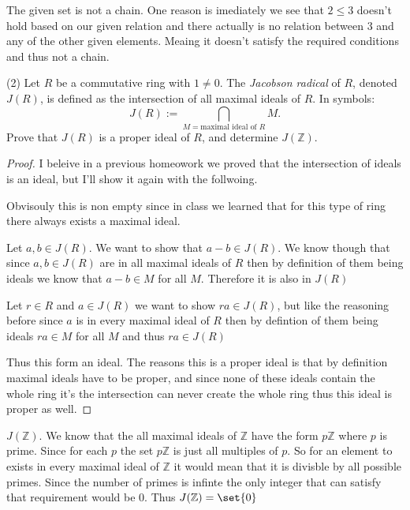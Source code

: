 \documentclass[12pt]{article}
\DeclarePairedDelimiter\set\{\}
\newcommand      {\Z}         {{\mathbb Z}}
\begin{document}
The given set is not a chain. One reason is imediately we see that $2\leq 3$ doesn't hold based on our given relation and there actually is no relation between 3 and any of the other given elements. Meaing it doesn't satisfy the required conditions and thus not a chain. 

\newpage
(2) Let $R$ be a commutative ring with $1\neq 0$. The \textit{Jacobson radical} of $R$, denoted $J(R)$, is defined as the intersection of all maximal ideals of $R$. In symbols:
\begin{equation*}
	J(R):=\bigcap_{M=\text{maximal ideal of }R} M.
\end{equation*}
Prove that $J(R)$ is a proper ideal of $R$, and determine $J(\Z)$.
\begin{proof}
	I beleive in a previous homeowork we proved that the intersection of ideals is an ideal, but I'll show it again with the follwoing. 

	Obvisouly this is non empty since in class we learned that for this type of ring there always exists a maximal ideal. 

	Let $a,b \in J(R)$. We want to show that $a-b \in J(R)$. We know though that since $a,b\in J(R)$ are in all maximal ideals of $R$ then by definition of them being ideals we know that $a-b \in M$ for all $M$. Therefore it is also in $J(R)$

	Let $r \in R$ and $a\in J(R)$ we want to show $ra \in J(R)$, but like the reasoning before since $a$ is in every maximal ideal of $R$ then by defintion of them being ideals $ra \in M$ for all $M$ and thus $ra\in J(R)$ 

	Thus this form an ideal. The reasons this is a proper ideal is that by definition maximal ideals have to be proper, and since none of these ideals contain the whole ring it's the intersection can never create the whole ring thus this ideal is proper as well. 
\end{proof}

$J(\Z)$. We know that the all maximal ideals of $\Z$ have the form $p\Z$ where $p$ is prime. Since for each $p$ the set $p\Z$ is just all multiples of $p$. So for an element to exists in every maximal ideal of $\Z$ it would mean that it is divisble by all possible primes. Since the number of primes is infinte the only integer that can satisfy that requirement would be $0$. Thus $J(\Z) = \set{0}$
\end{document}
